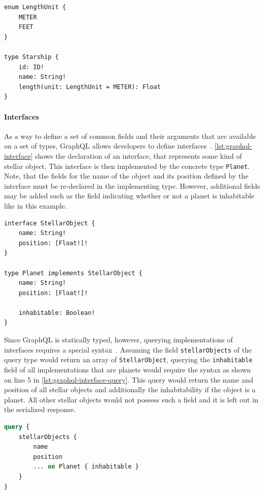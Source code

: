 \begin{lstlisting}[caption={Enumeration Types and Arguments on GraphQL Fields}, language=graphqls, label={lst:graphql-enum}]
enum LengthUnit {
    METER
    FEET
}

type Starship {
    id: ID!
    name: String!
    length(unit: LengthUnit = METER): Float
}
\end{lstlisting}

\paragraph{Interfaces}

As a way to define a set of common fields and their arguments that are available on a set of types, GraphQL allows developers to define interfaces~\cite{Facebook2018}.
\autoref{lst:graphql-interface} shows the declaration of an interface, that represents some kind of stellar object.
This interface is then implemented by the concrete type \texttt{Planet}.
Note, that the fields for the name of the object and its position defined by the interface must be re-declared in the implementing type.
However, additional fields may be added such as the field indicating whether or not a planet is inhabitable like in this example.

\begin{lstlisting}[caption={Interfaces in GraphQL Schemas}, language=graphqls, label={lst:graphql-interface}]
interface StellarObject {
    name: String!
    position: [Float!]!
}

type Planet implements StellarObject {
    name: String!
    position: [Float!]!

    inhabitable: Boolean!
}
\end{lstlisting}

Since GraphQL is statically typed, however, querying implementations of interfaces requires a special syntax~\cite{Facebook2018}.
Assuming the field \texttt{stellarObjects} of the query type would return an array of \texttt{StellarObject}, querying the \texttt{inhabitable} field of all implementations that are planets would require the syntax as shown on line 5 in \autoref{lst:graphql-interface-query}.
This query would return the name and position of all stellar objects and additionally the inhabitability if the object is a planet.
All other stellar objects would not possess such a field and it is left out in the serialized response.

\begin{lstlisting}[caption={Querying Interfaces in GraphQL}, language=graphql, label={lst:graphql-interface-query}]
query {
    stellarObjects {
        name
        position
        ... on Planet { inhabitable }
    }
}
\end{lstlisting}

